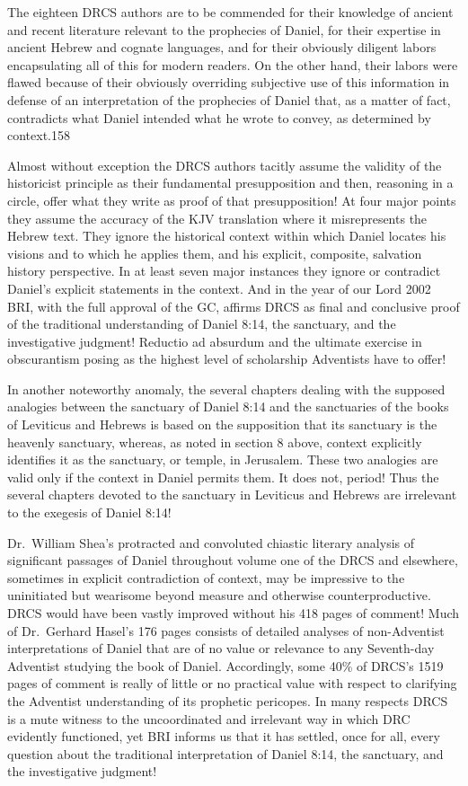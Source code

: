 The eighteen DRCS authors are to be commended for their knowledge of ancient
and recent literature relevant to the prophecies of Daniel, for their
expertise in ancient Hebrew and cognate languages, and for their obviously
diligent labors encapsulating all of this for modern readers. On the other
hand, their labors were flawed because of their obviously overriding
subjective use of this information in defense of an interpretation of the
prophecies of Daniel that, as a matter of fact, contradicts what Daniel
intended what he wrote to convey, as determined by context.158

Almost without exception the DRCS authors tacitly assume the validity of the
historicist principle as their fundamental presupposition and then,
reasoning in a circle, offer what they write as proof of that
presupposition! At four major points they assume the accuracy of the KJV
translation where it misrepresents the Hebrew text. They ignore the
historical context within which Daniel locates his visions and to which he
applies them, and his explicit, composite, salvation history perspective. In
at least seven major instances they ignore or contradict Daniel's explicit
statements in the context. And in the year of our Lord 2002 BRI, with the
full approval of the GC, affirms DRCS as final and conclusive proof of the
traditional understanding of Daniel 8:14, the sanctuary, and the 
investigative judgment! Reductio ad absurdum and the ultimate exercise in
obscurantism posing as the highest level of scholarship Adventists have to
offer!

In another noteworthy anomaly, the several chapters dealing with the
supposed analogies between the sanctuary of Daniel 8:14 and the sanctuaries
of the books of Leviticus and Hebrews is based on the supposition that its
sanctuary is the heavenly sanctuary, whereas, as noted in section 8 above,
context explicitly identifies it as the sanctuary, or temple, in Jerusalem.
These two analogies are valid only if the context in Daniel permits them. It
does not, period! Thus the several chapters devoted to the sanctuary in
Leviticus and Hebrews are irrelevant to the exegesis of Daniel 8:14! 

Dr.\ William Shea's protracted and convoluted chiastic literary analysis of
significant passages of Daniel throughout volume one of the DRCS and
elsewhere, sometimes in explicit contradiction of context, may be impressive
to the uninitiated but wearisome beyond measure and otherwise
counterproductive. DRCS would have been vastly improved without his 418
pages of comment! Much of Dr.\ Gerhard Hasel's 176 pages consists of
detailed analyses of non-Adventist interpretations of Daniel that are of no
value or relevance to any Seventh-day Adventist studying the book of Daniel.
Accordingly, some 40\% of DRCS's 1519 pages of comment is really of little or
no practical value with respect to clarifying the Adventist understanding of
its prophetic pericopes. In many respects DRCS is a mute witness to the
uncoordinated and irrelevant way in which DRC evidently functioned, yet BRI
informs us that it has settled, once for all, every question about the
traditional interpretation of Daniel 8:14, the sanctuary, and the
investigative judgment!

